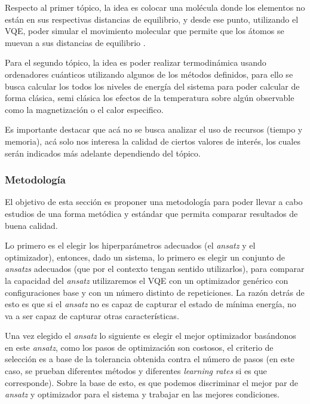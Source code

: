 Respecto al primer tópico, la idea es colocar una molécula donde los elementos no están en sus respectivas distancias de equilibrio, y desde ese punto, utilizando el VQE, poder simular el movimiento molecular que permite que los átomos se muevan a sus distancias de equilibrio \cite{OptimizationStruture}.

Para el segundo tópico, la idea es poder realizar termodinámica usando ordenadores cuánticos utilizando algunos de los métodos definidos, para ello se busca calcular los todos los niveles de energía del sistema para poder calcular de forma clásica, semi clásica los efectos de la temperatura sobre algún observable como la magnetización o el calor especifico. 

Es importante destacar que acá no se busca analizar el uso de recursos (tiempo y memoria), acá solo nos interesa la calidad de ciertos valores de interés, los cuales serán indicados más adelante dependiendo del tópico.

\subsubsection{Metodología}
El objetivo de esta sección es proponer una metodología para poder llevar a cabo estudios de una forma metódica y estándar que permita comparar resultados de buena calidad.

Lo primero es el elegir los hiperparámetros adecuados (el \textit{ansatz} y el optimizador), entonces, dado un sistema, lo primero es elegir un conjunto de \textit{ansatzs} adecuados (que por el contexto tengan sentido utilizarlos), para comparar la capacidad del \textit{ansatz} utilizaremos el VQE con un optimizador genérico con configuraciones base y con un número distinto de repeticiones. La razón detrás de esto es que si el \textit{ansatz} no es capaz de capturar el estado de mínima energía, no va a ser capaz de capturar otras características. 

Una vez elegido el \textit{ansatz} lo siguiente es elegir el mejor optimizador basándonos en este \textit{ansatz}, como los pasos de optimización son costosos, el criterio de selección es a base de la tolerancia obtenida contra el número de pasos (en este caso, se prueban diferentes métodos y diferentes \textit{learning rates} si es que corresponde). Sobre la base de esto, es que podemos discriminar el mejor par de \textit{ansatz} y optimizador para el sistema y trabajar en las mejores condiciones.


